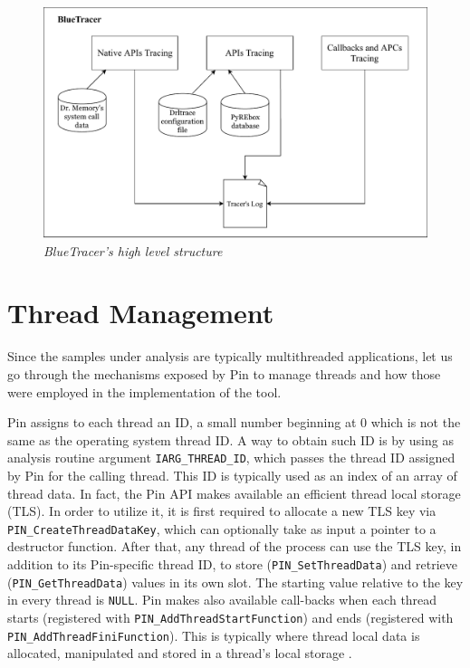 \begin{figure}[h]
\centering
\includegraphics[width=1\textwidth]{Figures/BlueTracer.pdf}
\caption{\textit{BlueTracer's high level structure}}
\label{structure}
\end{figure}

\section{Thread Management}

Since the samples under analysis are typically multithreaded applications, let us go through the mechanisms exposed by Pin to manage threads and how those were employed in the implementation of the tool.

Pin assigns to each thread an ID, a small number beginning at 0
which is not the same as the operating system thread ID. A way to obtain such ID is by using as analysis routine argument \texttt{IARG\_THREAD\_ID}, which passes the thread ID assigned by Pin for the calling thread. This ID is typically used as an index of an array of thread data.
In fact, the Pin API makes available an efficient thread local storage (TLS). In order to utilize it, it is first required to allocate a new TLS key via \texttt{PIN\_CreateThreadDataKey}, which can optionally take as input a pointer to a destructor function. After that, any thread of the process can use the TLS key, in addition to its Pin-specific thread ID, to store (\texttt{PIN\_SetThreadData}) and retrieve (\texttt{PIN\_GetThreadData}) values in its own slot. The starting value relative to the key in every thread is \texttt{NULL}.
Pin makes also available call-backs when each thread starts (registered with \texttt{PIN\_AddThreadStartFunction}) and ends (registered with \texttt{PIN\_AddThreadFiniFunction}). This is typically where thread local data is allocated, manipulated and stored in a thread's local storage \cite{Pin}.

